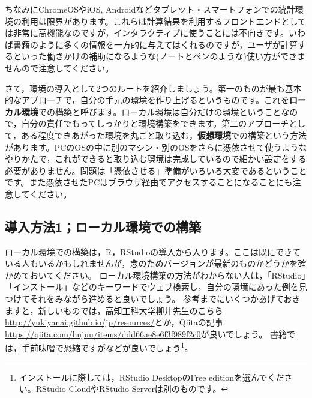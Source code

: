 \documentclass{ltjsbook}
\begin{document}
ちなみにChromeOSやiOS, Androidなどタブレット・スマートフォンでの統計環境の利用は限界があります。これらは計算結果を利用するフロントエンドとしては非常に高機能なのですが，インタラクティブに使うことには不向きです。いわば書籍のように多くの情報を一方的に与えてはくれるのですが，ユーザが計算するといった働きかけの補助になるような(ノートとペンのような)使い方ができませんので注意してください。

さて，環境の導入として2つのルートを紹介しましょう。第一のものが最も基本的なアプローチで，自分の手元の環境を作り上げるというものです。これを\textbf{ローカル環境}での構築と呼びます。ローカル環境は自分だけの環境ということなので，自分の責任でもってしっかりと環境構築をできます。第二のアプローチとして，ある程度できあがった環境を丸ごと取り込む，\textbf{仮想環境}での構築という方法があります。PCのOSの中に別のマシン・別のOSをさらに憑依させて使うようなやりかたで，これができると取り込む環境は完成しているので細かい設定をする必要がありません。問題は「憑依させる」準備がいろいろ大変であるということです。また憑依させたPCはブラウザ経由でアクセスすることになることにも注意してください。

\subsection{導入方法1；ローカル環境での構築}

ローカル環境での構築は，R，RStudioの導入から入ります。ここは既にできている人もいるかもしれませんが，念のためバージョンが最新のものかどうかを確かめておいてください。
ローカル環境構築の方法がわからない人は，「RStudio」「インストール」などのキーワードでウェブ検索し，自分の環境にあった例を見つけてそれをみながら進めると良いでしょう。
参考までにいくつかあげておきますと，新しいものでは，高知工科大学柳井先生のこちら\url{http://yukiyanai.github.io/jp/resources/}とか，Qiitaの記事\url{https://qiita.com/hujuu/items/ddd66ae8e6f3f989f2c0}が良いでしょう。
書籍では，手前味噌で恐縮ですが\textcite{kosugi2019}などが良いでしょう\footnote{インストールに際しては，RStudio DesktopのFree editionを選んでください。RStudio CloudやRStudio Serverは別のものです。}。
\end{document}
